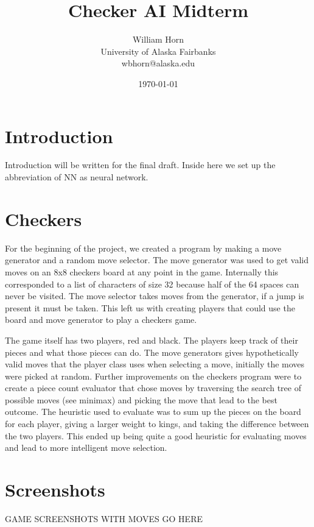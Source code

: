 \documentclass{article}
\begin{document}
\title{Checker AI Midterm}
\author{William Horn\\University of Alaska Fairbanks\\wbhorn@alaska.edu}
\date{\today}
\maketitle

\section{Introduction}

Introduction will be written for the final draft. Inside here we set up the
abbreviation of NN as neural network.

\section{Checkers}

For the beginning of the project, we created a program by making a
move generator and a random move selector. The move generator was used to get
valid moves on an 8x8 checkers board at any point in the game. Internally this
corresponded to a list of characters of size 32 because half of the 64 spaces
can never be visited. The move selector takes moves from the generator, if a
jump is present it must be taken. This left us with creating players that could
use the board and move generator to play a checkers game.

The game itself has two players, red and black. The players keep track of their pieces and what
those pieces can do. The move generators gives hypothetically valid moves that
the player class uses when selecting a move, initially the moves were picked at
random. Further improvements on the checkers program were to create a piece
count evaluator that chose moves by traversing the search tree of possible
moves (see minimax) and picking the move that lead to the best outcome. The
heuristic used to evaluate was to sum up the pieces on the board for each
player, giving a larger weight to kings, and taking the difference between the
two players. This ended up being quite a good heuristic for evaluating moves
and lead to more intelligent move selection.

\section{Screenshots}

     GAME SCREENSHOTS WITH MOVES GO HERE
\end{document}
